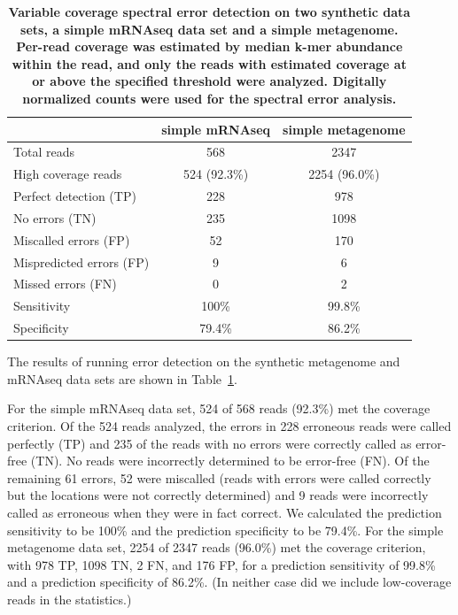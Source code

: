 \documentclass{article}
\begin{document}

\begin{table}
\begin{tabular}{|l|c|c|}
\hline
                            & {\bf simple mRNAseq } & {\bf simple metagenome}\\
\hline
Total reads                 & 568                   & 2347 \\
High coverage reads         & 524 (92.3\%)          & 2254 (96.0\%) \\
\hline
Perfect detection (TP)      & 228                   & 978 \\
No errors (TN)              & 235                   & 1098 \\
Miscalled errors (FP)       & 52                    & 170\\
Mispredicted errors (FP)    & 9                     & 6 \\
Missed errors (FN)          & 0                     & 2 \\
\hline
Sensitivity                 & 100\%                 & 99.8\% \\
Specificity                 & 79.4\%                & 86.2\% \\
\hline
\end{tabular}

\caption{{\bf Variable coverage spectral error detection on two synthetic
  data sets, a simple mRNAseq data set and a simple metagenome.
  Per-read coverage was estimated by median k-mer abundance within the
  read, and only the reads with estimated coverage at or above the
  specified threshold were analyzed.  Digitally normalized counts were
  used for the spectral error analysis.}}
\label{tab:spectra_variable}
\end{table}

The results of running error detection on the synthetic metagenome and
mRNAseq data sets are shown in Table~\ref{tab:spectra_variable}.

For the simple mRNAseq data
set, 524 of 568 reads (92.3\%) met the coverage criterion.  Of the
524 reads analyzed, the errors in 228 erroneous reads were called
perfectly (TP) and 235 of the reads with no errors were correctly
called as error-free (TN).  No reads were incorrectly determined
to be error-free (FN).  Of the remaining 61 errors, 52 were miscalled
(reads with errors were called correctly but the locations were
not correctly determined) and 9 reads were incorrectly called as erroneous
when they were in fact correct.  We calculated the prediction
sensitivity to be 100\% and the prediction specificity to be
79.4\%.
For the simple metagenome data set,
2254 of 2347 reads (96.0\%) met the coverage criterion, with 978 TP,
1098 TN, 2 FN, and 176 FP, for a prediction sensitivity of 99.8\% and
a prediction specificity of 86.2\%.  (In neither case did we include
low-coverage reads in the statistics.)
\end{document}
